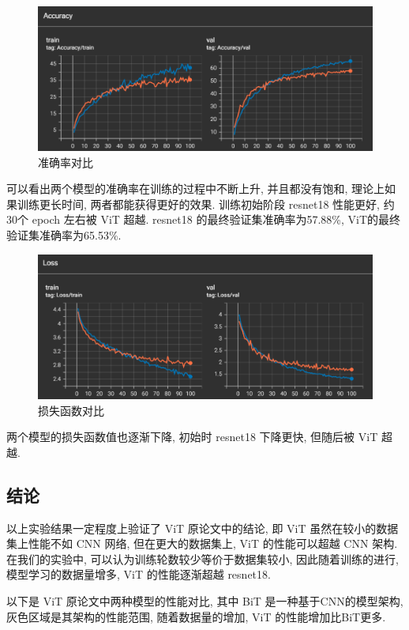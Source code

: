 \documentclass[notitlepage,cs4size,punct,oneside]{ctexrep}
\numberwithin{equation}{chapter}
\theoremstyle{mystyle}
\begin{document}
\begin{figure}[H]
    \centering
    \includegraphics[scale=0.75]{transformer_acc.png}
    \caption{准确率对比}
\end{figure}
可以看出两个模型的准确率在训练的过程中不断上升, 并且都没有饱和, 理论上如果训练更长时间, 两者都能获得更好的效果. 训练初始阶段 resnet18 性能更好, 约30个 epoch 左右被 ViT 超越. resnet18 的最终验证集准确率为57.88\%, ViT的最终验证集准确率为65.53\%.
\begin{figure}[H]
    \centering
    \includegraphics[scale=0.75]{transformer_loss.png}
    \caption{损失函数对比}
\end{figure}
两个模型的损失函数值也逐渐下降, 初始时 resnet18 下降更快, 但随后被 ViT 超越.



\subsection{结论}
以上实验结果一定程度上验证了 ViT 原论文中的结论, 即 ViT 虽然在较小的数据集上性能不如 CNN 网络, 但在更大的数据集上, ViT 的性能可以超越 CNN 架构. 在我们的实验中, 可以认为训练轮数较少等价于数据集较小, 因此随着训练的进行, 模型学习的数据量增多, ViT 的性能逐渐超越 resnet18.

以下是 ViT 原论文中两种模型的性能对比, 其中 BiT 是一种基于CNN的模型架构, 灰色区域是其架构的性能范围, 随着数据量的增加, ViT 的性能增加比BiT更多.
\end{document}
